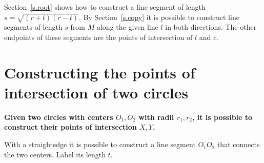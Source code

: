 Section~\ref{s.root} shows how to construct a line segment of length $s=\sqrt{(r+t)(r-t)}$. By Section~\ref{s.copy} it is possible to construct line segments of length $s$ from $M$ along the given line $l$ in both directions. The other endpoints of these segments are the points of intersection of $l$ and $c$.


\section{Constructing the points of intersection of two circles}\label{s.two-circles}

\textbf{Given two circles with centers $O_1,O_2$ with radii $r_1,r_2$, it is possible to construct their points of intersection $X,Y$.}

With a straightedge it is possible to construct a line segment $O_1O_2$ that connects the two centers. Label its length $t$.

\begin{center}
\end{center}

